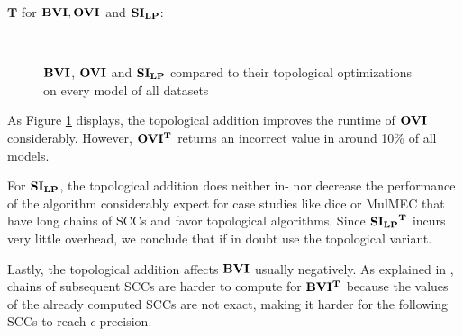 $\mathbf{T}$ for $\mathbf{BVI}, \mathbf{OVI}$ and $\mathbf{SI_{LP}}$: \label{subsubsec:topologicalOptim}
\begin{figure}[h!]
    \centering
    \
    \caption{$\mathbf{BVI}$, $\mathbf{OVI}$ and $\mathbf{SI_{LP}}$ compared to their topological optimizations on every model of all datasets}%
    \label{fig:Scatter_T}%
    \end{figure}
\FloatBarrier

As Figure \ref{fig:Scatter_T} displays, the topological addition improves the runtime of $\mathbf{OVI}$ considerably. 
However, $\mathbf{OVI^T}$ returns an incorrect value in around 10\% of all models.

For $\mathbf{SI_{LP}}$, the topological addition does neither in- nor decrease the performance of the algorithm considerably expect for case studies
like dice or MulMEC that have long chains of SCCs and favor topological algorithms.
Since $\mathbf{\mathbf{SI_{LP}}^T}$ incurs very little overhead, we conclude that if in doubt use the topological variant.

Lastly, the topological addition affects $\mathbf{BVI}$ usually negatively. As explained in \cite{gandalf}, 
chains of subsequent SCCs are harder to compute for $\mathbf{BVI^T}$ because the values of the already computed SCCs are not exact, 
making it harder for the following SCCs to reach $\epsilon$-precision.


